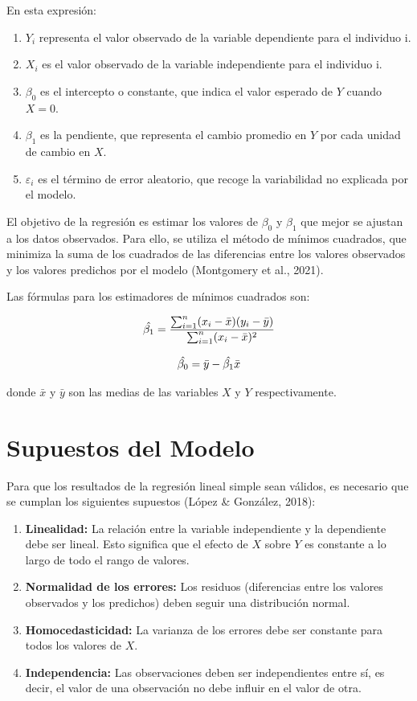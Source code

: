 \documentclass[
  spanish,
  letterpaper,
]{book}
\begin{document}
En esta expresión:

\begin{enumerate}
\def\labelenumi{\arabic{enumi}.}
\item
  \(Y_i\) representa el valor observado de la variable dependiente para
  el individuo i.
\item
  \(X_i\) es el valor observado de la variable independiente para el
  individuo i.
\item
  \(\beta_0\) es el intercepto o constante, que indica el valor esperado
  de \(Y\) cuando \(X=0\).
\item
  \(\beta_1\) es la pendiente, que representa el cambio promedio en
  \(Y\) por cada unidad de cambio en \(X\).
\item
  \(\varepsilon_i\) es el término de error aleatorio, que recoge la
  variabilidad no explicada por el modelo.
\end{enumerate}

El objetivo de la regresión es estimar los valores de
\(\beta_0\)\hspace{0pt} y \(\beta_1\)\hspace{0pt} que mejor se ajustan a
los datos observados. Para ello, se utiliza el método de mínimos
cuadrados, que minimiza la suma de los cuadrados de las diferencias
entre los valores observados y los valores predichos por el modelo
(Montgomery et al., 2021).

Las fórmulas para los estimadores de mínimos cuadrados son:

\[\LARGE \hat{\beta_1} = \frac{\sum_{i=1}^{n} (x_i - \bar{x})(y_i - \bar{y})}{\sum_{i=1}^{n} (x_i - \bar{x})^2}\]

\[\LARGE \hat{\beta_0} = \bar{y} - \hat{\beta_1}\bar{x}\]

donde \(\bar{x}\) y \(\bar{y}\) son las medias de las variables \(X\) y
\(Y\) respectivamente.

\section{Supuestos del Modelo}\label{supuestos-del-modelo}

Para que los resultados de la regresión lineal simple sean válidos, es
necesario que se cumplan los siguientes supuestos (López \& González,
2018):

\begin{enumerate}
\def\labelenumi{\arabic{enumi}.}
\item
  \textbf{Linealidad:} La relación entre la variable independiente y la
  dependiente debe ser lineal. Esto significa que el efecto de \(X\)
  sobre \(Y\) es constante a lo largo de todo el rango de valores.
\item
  \textbf{Normalidad de los errores:} Los residuos (diferencias entre
  los valores observados y los predichos) deben seguir una distribución
  normal.
\item
  \textbf{Homocedasticidad:} La varianza de los errores debe ser
  constante para todos los valores de \(X\).
\item
  \textbf{Independencia:} Las observaciones deben ser independientes
  entre sí, es decir, el valor de una observación no debe influir en el
  valor de otra.
\end{enumerate}
\end{document}
